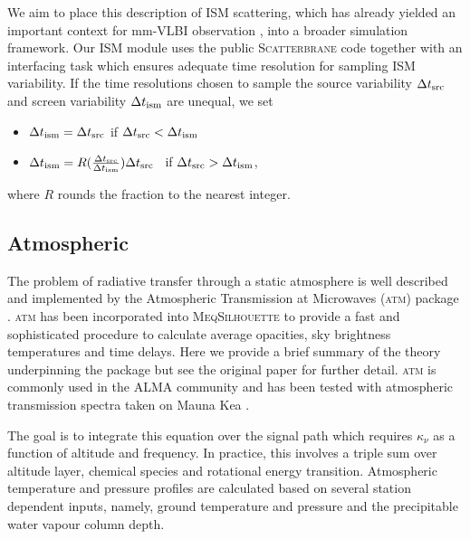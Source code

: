 We aim to place this description of ISM scattering, which has already yielded an important context for mm-VLBI observation \citep[e.g.][]{2016arXiv160106571O}, into a broader simulation framework. Our ISM module uses the public \textsc{Scatterbrane} code together with an interfacing task which ensures adequate time resolution for sampling ISM variability. If the time resolutions chosen to sample the source variability $\Delta t_{\rm src}$ and screen variability $\Delta t_{\rm ism}$ are unequal, we set  
\begin{itemize}
 \setlength\itemsep{1em}
\item $\Delta t_{\rm ism}=\Delta t_{\rm src}$ \qquad \qquad if \qquad  $\Delta t_{\rm src} < \Delta t_{\rm ism}$
\item $\Delta t_{\rm ism}=R(\frac{\Delta t_{\rm src}}{\Delta t_{\rm ism}})\Delta t_{\rm src}$ \ if \qquad  $\Delta t_{\rm src} > \Delta t_{\rm ism}$,
\end{itemize}
where $R$ rounds the fraction to the nearest integer. 



\subsection{Atmospheric}
The problem of radiative transfer through a static atmosphere is well described and implemented by the Atmospheric Transmission at Microwaves (\textsc{atm}) package \citep{Pardo_2001}. \textsc{atm} has been incorporated into \textsc{MeqSilhouette} to provide a fast and sophisticated procedure to calculate average opacities, sky brightness temperatures and time delays. Here we provide a brief summary of the theory underpinning the package but see the original paper for further detail. \textsc{atm} is commonly used in the ALMA community \citep{Curtis_2009,Nikolic_2013} and has been tested with atmospheric transmission spectra taken on Mauna Kea \citep{Serabyn_1998}.


The goal is to integrate this equation over the signal path which requires $\kappa_\nu$ as a function of altitude and frequency. In practice, this involves a triple sum over altitude layer, chemical species and rotational energy transition. Atmospheric temperature and pressure profiles are calculated based on several station dependent inputs, namely, ground temperature and pressure and the precipitable water vapour column depth.

